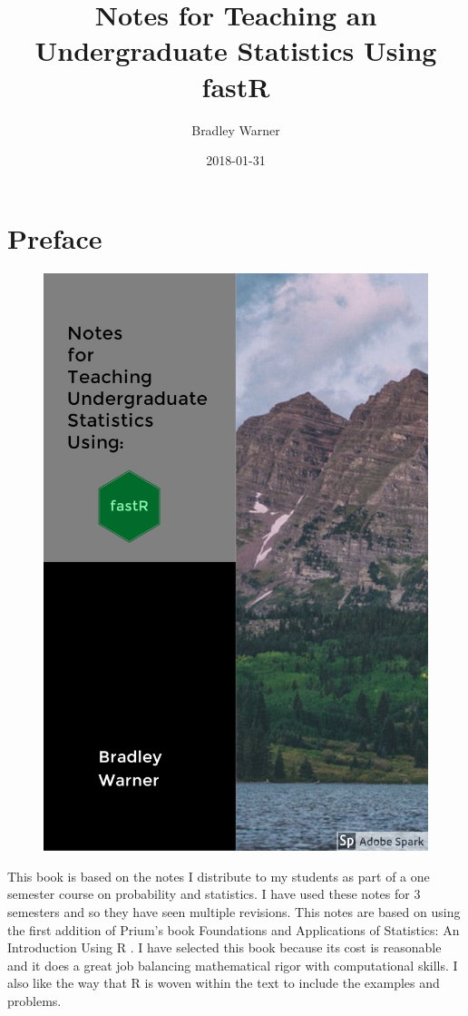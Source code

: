 \documentclass[]{book}
\title{Notes for Teaching an Undergraduate Statistics Using fastR}
\author{Bradley Warner}
\date{2018-01-31}
\theoremstyle{definition}
\theoremstyle{definition}
\theoremstyle{definition}
\theoremstyle{remark}
\begin{document}
\maketitle

{
\setcounter{tocdepth}{1}
\tableofcontents
}
\chapter*{Preface}\label{preface}

\begin{figure}
\centering
\includegraphics{./images/Cover3.jpg}
\caption{}
\end{figure}

This book is based on the notes I distribute to my students as part of a
one semester course on probability and statistics. I have used these
notes for 3 semesters and so they have seen multiple revisions. This
notes are based on using the first addition of Prium's book Foundations
and Applications of Statistics: An Introduction Using R
\citeyearpar{pruim2011foundations}. I have selected this book because
its cost is reasonable and it does a great job balancing mathematical
rigor with computational skills. I also like the way that R is woven
within the text to include the examples and problems.
\end{document}
